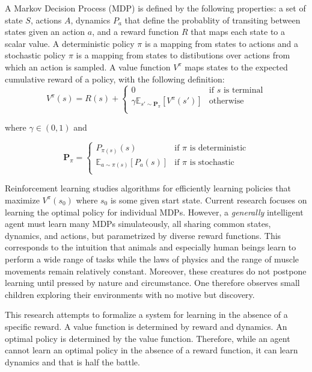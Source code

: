 \documentclass{article}
\begin{document}
A Markov Decision Process (MDP) is defined by the following properties: a set of state $S$, actions $A$, dynamics $P_a$ that define the probablity of transiting between states given an action $a$, and a reward function $R$ that maps each state to a scalar value. A deterministic policy $\pi$ is a mapping from states to actions and a stochastic policy $\pi$ is a mapping from states to distibutions over actions from which an action is sampled. A value function $V^\pi$ maps states to the expected cumulative reward of a policy, with the following definition:
\[
  V^\pi(s) = R(s) +
  \begin{cases}
    0 & \text{if $s$ is terminal}\\ 
    \gamma \mathbb{E}_{s' \sim \mathbf{P}_\pi} \left[ V^\pi(s') \right] & \text{otherwise} \\ 
  \end{cases}
\]

where $\gamma \in (0, 1)$ and

\[
  \mathbf{P}_\pi = 
  \begin{cases}
    P_{\pi(s)}(s) & \text{if $\pi$ is deterministic} \\
    \mathbb{E}_{a \sim \pi(s)}\left[ P_a(s) \right] & \text{if $\pi$ is stochastic} \\
  \end{cases}
\]

Reinforcement learning studies algorithms for efficiently learning policies that maximize $V^\pi(s_0)$ where $s_0$ is some given start state. Current research focuses on learning the optimal policy for individual MDPs. However, a \textit{generally} intelligent agent must learn many MDPs simulateously, all sharing common states, dynamics, and actions, but parametrized by diverse reward functions. This corresponds to the intuition that animals and especially human beings learn to perform a wide range of tasks while the laws of physics and the range of muscle movements remain relatively constant. Moreover, these creatures do not postpone learning until pressed by nature and circumstance. One therefore observes small children exploring their environments with no motive but discovery.

This research attempts to formalize a system for learning in the absence of a specific reward. A value function is determined by reward and dynamics. An optimal policy is determined by the value function. Therefore, while an agent cannot learn an optimal policy in the absence of a reward function, it can learn dynamics and that is half the battle. 
\end{document}
